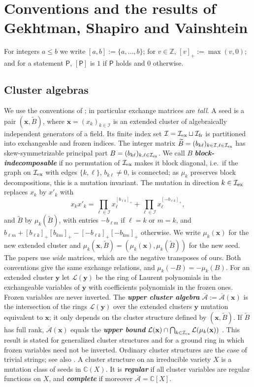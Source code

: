 \documentclass[a4paper]{amsart}
\numberwithin{equation}{section}
\theoremstyle{definition}
\theoremstyle{remark}
\newcommand{\bbC}{\mathbb{C}}
\newcommand{\bbZ}{\mathbb{Z}}
\newcommand{\mcL}{\mathcal{L}}
\newcommand{\mcI}{\mathcal{I}}
\newcommand{\oA}{\overline{\mathcal{A}}}
\newcommand{\bx}{\mathbf{x}}
\newcommand{\by}{\mathbf{y}}
\newcommand{\tB}{\widetilde{B}}
\newcommand{\ex}{{\rm ex}}
\newcommand{\fr}{{\rm fr}}
\newcommand{\newword}[1]{\textbf{\emph{#1}}}
\begin{document}
\section{Conventions and the results of Gekhtman, Shapiro and Vainshtein}
\label{sec: conventions}
For integers $a\le b$ we write $[a,b]:=\{a,\dots,b\}$; for $v\in\bbZ$, $[v]_+:=\max(v,0)$; and for a statement $\mathsf P$, $[\mathsf P]$ is $1$ if $\mathsf P$ holds and $0$ otherwise.

\subsection{Cluster algebras}
\label{sec: cluster conventions}
We use the conventions of \cite{BFZ05}; in particular exchange matrices are \emph{tall}.
A seed is a pair $(\bx,\tB)$, where $\bx=(x_k)_{k\in\mcI}$ is an extended cluster of algebraically independent generators of a field.
Its finite index set $\mcI=\mcI_\ex\sqcup\mcI_\fr$ is partitioned into exchangeable and frozen indices.
The integer matrix $\tB=(b_{k\ell})_{k\in\mcI,\ell\in\mcI_\ex}$ has skew-symmetrizable principal part $B=(b_{k\ell})_{k,\ell\in\mcI_\ex}$.
We call $B$ \newword{block-indecomposable} if no permutation of $\mcI_\ex$ makes it block diagonal, i.e.\ if the graph on $\mcI_\ex$ with edges $\{k,\ell\}$, $b_{k\ell}\neq0$, is connected; as $\mu_k$ preserves block decompositions, this is a mutation invariant.
The mutation in direction $k\in\mcI_\ex$ replaces $x_k$ by $x'_k$ with
\begin{equation}
  \label{eq: exchange}
  x_kx'_k=\prod_{\ell\in\mcI}x_\ell^{[b_{\ell k}]_+}+\prod_{\ell\in\mcI}x_\ell^{[-b_{\ell k}]_+},
\end{equation}
and $\tB$ by $\mu_k(\tB)$, with entries $-b_{\ell m}$ if $\ell=k$ or $m=k$, and $b_{\ell m}+[b_{\ell k}]_+[b_{km}]_+-[-b_{\ell k}]_+[-b_{km}]_+$ otherwise.
We write $\mu_k(\bx)$ for the new extended cluster and $\mu_k(\bx,\tB)=(\mu_k(\bx),\mu_k(\tB))$ for the new seed.
The papers \cite{GSV10,GSV19,GSV23} use \emph{wide} matrices, which are the negative transposes of ours. Both conventions give the same exchange relations, and $\mu_k(-B)=-\mu_k(B)$.
For an extended cluster $\by$ let $\mcL(\by)$ be the ring of Laurent polynomials in the exchangeable variables of $\by$ with coefficients polynomials in the frozen ones. Frozen variables are never inverted.
The \newword{upper cluster algebra} $\oA:=\oA(\bx)$ is the intersection of the rings $\mcL(\by)$ over the extended clusters $\by$ mutation equivalent to $\bx$; it only depends on the cluster structure defined by $(\bx,\tB)$.
If $\tB$ has full rank, $\oA(\bx)$ equals the \newword{upper bound} $\mcL(\bx)\cap\bigcap_{k\in\mcI_\ex}\mcL(\mu_k(\bx))$ \cite[Theorem~3.11]{GSV18dd}. This result is stated for generalized cluster structures and for a ground ring in which frozen variables need not be inverted. Ordinary cluster structures are the case of trivial strings; see also \cite[Theorem~3.21 and Section~3.4]{GSV10}.
A cluster structure on an irreducible variety $X$ is a mutation class of seeds in $\bbC(X)$.
  It is \newword{regular} if all cluster variables are regular functions on $X$, and \newword{complete} if moreover $\oA=\bbC[X]$.
\end{document}
